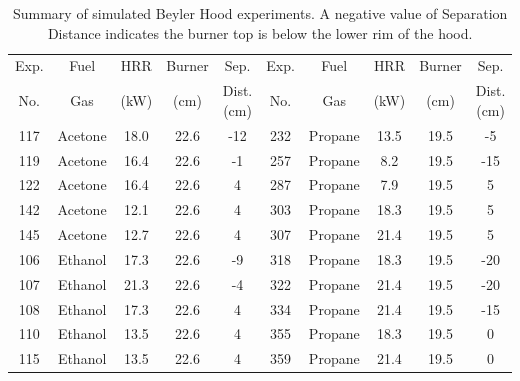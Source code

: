 \begin{table}[!ht]
\centering
\caption[Summary of simulated Beyler Hood experiments]{Summary of simulated Beyler Hood experiments. A negative value of Separation Distance indicates the burner top is below the lower rim of the hood.}
\label{beyler_sum}
\begin{tabular}{|c|c|c|c|c||c|c|c|c|c|}
\hline
Exp.   & Fuel          & HRR      & Burner           & Sep.           &  Exp.   & Fuel          & HRR      & Burner           & Sep.            \\
No.    & Gas           & (kW)     & (cm)             & Dist. (cm)     &  No.    & Gas           & (kW)     & (cm)             & Dist. (cm)      \\ \hline \hline
117    & Acetone       & 18.0     & 22.6             & -12            &  232    & Propane       & 13.5     & 19.5             & -5              \\ \hline
119    & Acetone       & 16.4     & 22.6             & -1             &  257    & Propane       & 8.2      & 19.5             & -15             \\ \hline
122    & Acetone       & 16.4     & 22.6             & 4              &  287    & Propane       & 7.9      & 19.5             & 5               \\ \hline
142    & Acetone       & 12.1     & 22.6             & 4              &  303    & Propane       & 18.3     & 19.5             & 5               \\ \hline
145    & Acetone       & 12.7     & 22.6             & 4              &  307    & Propane       & 21.4     & 19.5             & 5               \\ \hline
106    & Ethanol       & 17.3     & 22.6             & -9             &  318    & Propane       & 18.3     & 19.5             & -20             \\ \hline
107    & Ethanol       & 21.3     & 22.6             & -4             &  322    & Propane       & 21.4     & 19.5             & -20             \\ \hline
108    & Ethanol       & 17.3     & 22.6             & 4              &  334    & Propane       & 21.4     & 19.5             & -15             \\ \hline
110    & Ethanol       & 13.5     & 22.6             & 4              &  355    & Propane       & 18.3     & 19.5             & 0               \\ \hline
115    & Ethanol       & 13.5     & 22.6             & 4              &  359    & Propane       & 21.4     & 19.5             & 0               \\ \hline

\end{tabular}
\end{table}
